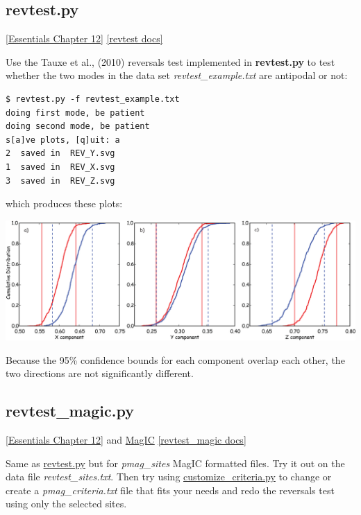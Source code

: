 \documentclass[11pt]{book}
\begin{document}
{{

\subsection{revtest.py}
\href{http://earthref.org/MAGIC/books/Tauxe/Essentials/WebBook3ch12.html#ch12}{[Essentials Chapter 12]}
\href{https://github.com/PmagPy/PmagPy/blob/master/programs/revtest.py}{[revtest docs]}

Use the Tauxe et al., (2010) reversals test implemented in {\bf revtest.py} to test whether the two modes in the data set {\it revtest\_example.txt} are antipodal or not:

\begin{verbatim}
$ revtest.py -f revtest_example.txt
doing first mode, be patient
doing second mode, be patient
s[a]ve plots, [q]uit: a
2  saved in  REV_Y.svg
1  saved in  REV_X.svg
3  saved in  REV_Z.svg

\end{verbatim}

\noindent which produces these plots:

{ %
\includegraphics[width=15cm]{EPSfiles/revtest.eps}}

Because the 95\% confidence bounds for each component overlap each other, the two directions are not significantly different.


\subsection{revtest\_magic.py}
\href{http://earthref.org/MAGIC/books/Tauxe/Essentials/WebBook3ch12.html#ch12}{ [Essentials Chapter 12]} and \href{#MagIC}{MagIC}
\href{https://github.com/PmagPy/PmagPy/blob/master/programs/revtest_magic.py}{[revtest\_magic docs]}

Same as \href{#revtest.py}{revtest.py} but for {\it pmag\_sites} MagIC formatted files.   Try it out on the data file {\it revtest\_sites.txt}.  Then try using \href{#customize_criteria.py}{customize\_criteria.py} to change or create a {\it pmag\_criteria.txt} file that fits your needs and redo the reversals test using only the selected sites.

}}
\end{document}
